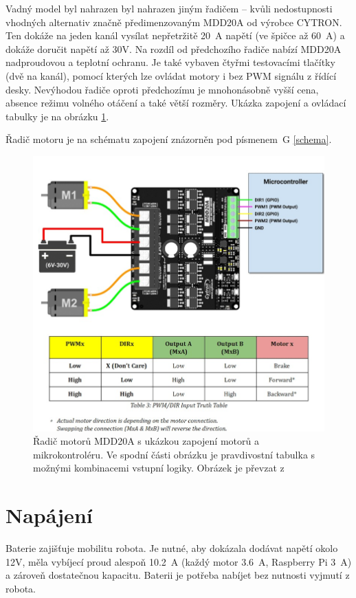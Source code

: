 Vadný model byl nahrazen byl nahrazen jiným řadičem -- kvůli nedostupnosti vhodných alternativ značně předimenzovaným MDD20A od výrobce CYTRON. Ten dokáže na jeden kanál vysílat nepřetržitě 20~A napětí (ve špičce až 60~A) a dokáže doručit napětí až 30V. Na rozdíl od předchozího řadiče nabízí MDD20A nadproudovou a teplotní ochranu. Je také vybaven čtyřmi testovacími tlačítky (dvě na kanál), pomocí kterých lze ovládat motory i bez PWM signálu z řídící desky. \cite{driver2} Nevýhodou řadiče oproti předchozímu je mnohonásobně vyšší cena, absence režimu volného otáčení a také větší rozměry. Ukázka zapojení a ovládací tabulky je na obrázku \ref{driver}.

Řadič motoru je na schématu zapojení znázorněn pod písmenem~G \ref{schema}.

\begin{figure}[H]
    \centering
    \includegraphics[width=0.9\linewidth]{obrazky-figures/driver.png}
    \caption {Řadič motorů MDD20A s ukázkou zapojení motorů a mikrokontroléru. Ve spodní části obrázku je pravdivostní tabulka s možnými kombinacemi vstupní logiky. Obrázek je převzat z \cite{driver2} }
    \label{driver}
\end{figure}


\section{Napájení}
Baterie zajišťuje mobilitu robota. Je nutné, aby dokázala dodávat napětí okolo 12V, měla vybíjecí proud alespoň 10.2~A (každý motor 3.6~A, Raspberry Pi 3~A) a zároveň dostatečnou kapacitu. Baterii je potřeba nabíjet bez nutnosti vyjmutí z robota.

